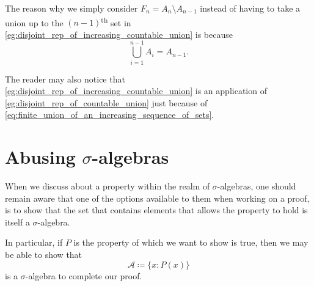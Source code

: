 \documentclass[notoc,notitlepage]{tufte-book}
\begin{document}
\begin{remark}
  The reason why we simply consider $F_n = A_n \setminus A_{n-1}$ instead
  of having to take a union up to the $(n-1)$\textsuperscript{th}
  set in \cref{eg:disjoint_rep_of_increasing_countable_union}
  is because
  \begin{equation}\label{eq:finite_union_of_an_increasing_sequence_of_sets}
    \bigcup_{i=1}^{n-1} A_i = A_{n-1}.
  \end{equation}

  The reader may also notice that
  \cref{eg:disjoint_rep_of_increasing_countable_union}
  is an application of \cref{eg:disjoint_rep_of_countable_union}
  just because of \cref{eq:finite_union_of_an_increasing_sequence_of_sets}.
\end{remark}

\section{Abusing \texorpdfstring{$\sigma$}{sigma}-algebras}%
\label{sec:abusing_sigma_algebras}

When we discuss about a property within the realm of $\sigma$-algebras,
one should remain aware that one of the options available to them
when working on a proof, is to show that the set that contains elements
that allows the property to hold is itself a $\sigma$-algebra.

In particular, if $P$ is the property of which we want to show is true,
then we may be able to show that
\begin{equation*}
  \mathcal{A} \coloneqq \{ x : P(x) \}
\end{equation*}
is a $\sigma$-algebra to complete our proof.


\backmatter

\fancyhead[LE]{\thepage \enspace \textsl{\leftmark}}



\printindex
\end{document}
